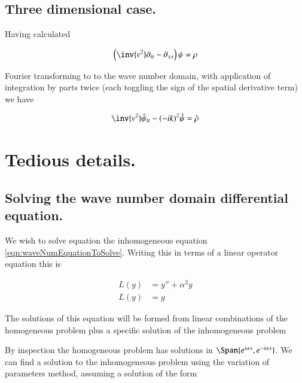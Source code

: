 \documentclass{article}
\begin{document}

\subsection{ Three dimensional case. }

Having calculated

\begin{align}
\left( \inv{v^2} \partial_{tt} -\partial_{xx} \right)\psi = \rho
\end{align}

Fourier transforming to to the wave number domain, with application of integration by parts twice (each toggling the sign of the spatial
derivative term) we have

\begin{align}
\inv{v^2}\hat{\psi}_{tt} - (-i k)^2 \hat{\psi} = \hat{\rho}
\end{align}

\section{ Tedious details. }

\subsection{ Solving the wave number domain differential equation. }

We wish to solve equation the inhomogeneous equation \ref{eqn:waveNumEquationToSolve}.  Writing this in terms of a linear operator equation this is

\begin{align*}
L(y) &= y'' + \alpha^2 y \\
L(y) &= g
\end{align*}

The solutions of this equation will be formed from linear combinations of the homogeneous problem plus a specific solution of the inhomogeneous problem

By inspection the homogeneous problem has solutions in $\Span \{ e^{ i \alpha x }, e^{ -i \alpha x }\}$.
We can find a solution to the inhomogeneous problem using the variation of parameters method, assuming a solution of the form
\end{document}
